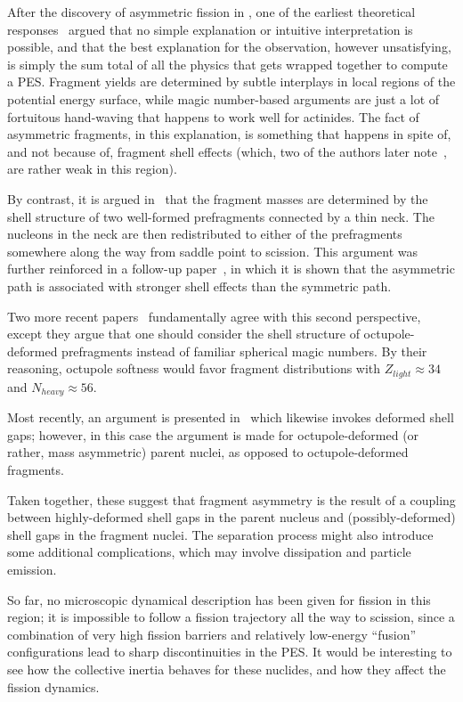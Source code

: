 After the discovery of asymmetric fission in {\Hg}, one of the earliest theoretical responses~\cite{Moller2012} argued that no simple explanation or intuitive interpretation is possible, and that the best explanation for the observation, however unsatisfying, is simply the sum total of all the physics that gets wrapped together to compute a PES. Fragment yields are determined by subtle interplays in local regions of the potential energy surface, while magic number-based arguments are just a lot of fortuitous hand-waving that happens to work well for actinides. The fact of asymmetric fragments, in this explanation, is something that happens in spite of, and not because of, fragment shell effects (which, two of the authors later note~\cite{Ichikawa2012}, are rather weak in this region).

By contrast, it is argued in~\cite{Warda2012a} that the fragment masses are determined by the shell structure of two well-formed prefragments connected by a thin neck. The nucleons in the neck are then redistributed to either of the prefragments somewhere along the way from saddle point to scission. This argument was further reinforced in a follow-up paper~\cite{Mcdonnell2014}, in which it is shown that the asymmetric path is associated with stronger shell effects than the symmetric path.

Two more recent papers~\cite{Scamps2018a, Scamps2019} fundamentally agree with this second perspective, except they argue that one should consider the shell structure of octupole-deformed prefragments instead of familiar spherical magic numbers. By their reasoning, octupole softness would favor fragment distributions with $Z_{light}\approx34$ and $N_{heavy}\approx56$.

Most recently, an argument is presented in~\cite{Ichikawa2019} which likewise invokes deformed shell gaps; however, in this case the argument is made for octupole-deformed (or rather, mass asymmetric) parent nuclei, as opposed to octupole-deformed fragments.

Taken together, these suggest that fragment asymmetry is the result of a coupling between highly-deformed shell gaps in the parent nucleus and (possibly-deformed) shell gaps in the fragment nuclei. The separation process might also introduce some additional complications, which may involve dissipation and particle emission.

So far, no microscopic dynamical description has been given for fission in this region; it is impossible to follow a fission trajectory all the way to scission, since a combination of very high fission barriers and relatively low-energy ``fusion'' configurations lead to sharp discontinuities in the PES. It would be interesting to see how the collective inertia behaves for these nuclides, and how they affect the fission dynamics.

